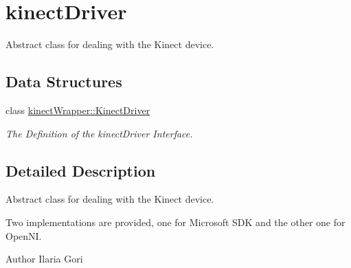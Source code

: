 \section{kinect\+Driver}
\label{group__kinectDriver}


Abstract class for dealing with the Kinect device.  


\subsection*{Data Structures}
\begin{DoxyCompactItemize}
\item 
class \hyperlink{classkinectWrapper_1_1KinectDriver}{kinect\+Wrapper\+::\+Kinect\+Driver}
\begin{DoxyCompactList}\small\item\em The Definition of the kinect\+Driver Interface. \end{DoxyCompactList}\end{DoxyCompactItemize}


\subsection{Detailed Description}
Abstract class for dealing with the Kinect device. 

Two implementations are provided, one for Microsoft S\+D\+K and the other one for Open\+N\+I.

\begin{DoxyAuthor}{Author}
Ilaria Gori 
\end{DoxyAuthor}
